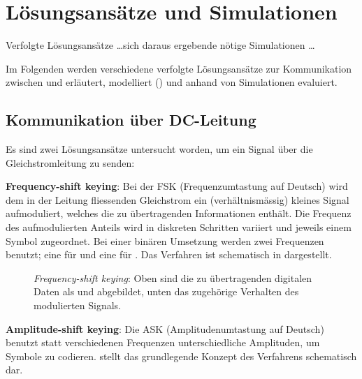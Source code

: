 \chapter{L\"osungsans\"atze und Simulationen}
\label{chap:simu}

Verfolgte L\"osungsans\"atze \ldots sich daraus ergebende n\"otige Simulationen \ldots

Im   Folgenden   werden    verschiedene   verfolgte   L\"osungsans\"atze   zur
Kommunikation   zwischen   \Sensor    und   \Master   erl\"autert,   modelliert
() und anhand von Simulationen evaluiert.


\section{Kommunikation \"uber DC-Leitung}
\label{sec:simu:dcLeitung}

Es sind  zwei L\"osungsans\"atze untersucht  worden, um ein Signal  \"uber die
Gleichstromleitung zu senden:

\textbf{Frequency-shift keying}: Bei  der FSK (Frequenzumtastung  auf Deutsch)
wird  dem in  der Leitung  fliessenden Gleichstrom  ein (verh\"altnism\"assig)
kleines  Signal aufmoduliert,  welches  die  zu \"ubertragenden  Informationen
enth\"alt. Die  Frequenz   des  aufmodulierten   Anteils  wird   in  diskreten
Schritten variiert  und jeweils  einem Symbol zugeordnet. Bei  einer bin\"aren
Umsetzung  werden  zwei  Frequenzen  benutzt; eine  f\"ur    und  eine
f\"ur  .   Das  Verfahren ist  schematisch  in  
dargestellt.

\begin{figure}[h!tb]
    \centering
    
    \caption{%
        \emph{Frequency-shift  keying}: Oben   sind  die   zu  \"ubertragenden
        digitalen  Daten  als    und   abgebildet,  unten  das
        zugeh\"orige Verhalten des  modulierten Signals.%
    }
    \label{fig:fsk:concept}
\end{figure}


\textbf{Amplitude-shift  keying}: Die  ASK (Amplitudenumtastung  auf  Deutsch)
benutzt statt verschiedenen Frequenzen unterschiedliche Amplituden, um Symbole
zu  codieren.    stellt  das  grundlegende  Konzept  des
Verfahrens schematisch dar.

